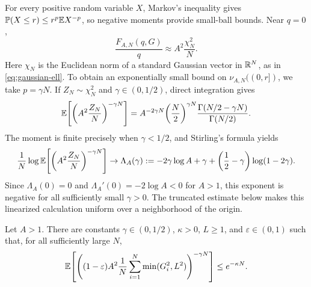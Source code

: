 \documentclass[11pt,reqno,a4paper]{article}
\newcommand{\Pp}{\P}
\newcommand{\Ee}{\E}
\begin{document}
\begin{remark}
\label{rem:gaussian-ell-negative-moments}
  For every positive random variable $X$, Markov's inequality gives
  $\Pp(X\leq r)\leq r^p\Ee X^{-p}$, so negative moments provide small-ball
  bounds. Near $q=0$,
  \begin{equation*}
    \frac{F_{A,N}(q,G)}{q}
    \approx
    A^2\frac{\chi_N^2}{N}.
  \end{equation*}
  Here $\chi_N$ is the Euclidean norm of a standard Gaussian vector in
  $\mathbb{R}^N$, as in \cref{eq:gaussian-ell}.
  To obtain an exponentially small bound on $\nu_{A,N}((0,r])$, we take
  $p=\gamma N$. If $Z_N\sim\chi_N^2$ and
  $\gamma\in(0,1/2)$, direct integration gives
  \begin{equation*}
    \Ee\left[
      \left(
        A^2\frac{Z_N}{N}
      \right)^{-\gamma N}
    \right]
    =
    A^{-2\gamma N}
    \left(\frac N2\right)^{\gamma N}
    \frac{\Gamma(N/2-\gamma N)}{\Gamma(N/2)}.
  \end{equation*}
  The moment is finite precisely when $\gamma<1/2$, and Stirling's formula
  yields
  \begin{equation*}
    \frac1N
    \log
    \Ee\left[
      \left(
        A^2\frac{Z_N}{N}
      \right)^{-\gamma N}
    \right]
    \to
    \Lambda_A(\gamma)
    :=
    -2\gamma\log A
    +
    \gamma
    +
    \left(\frac12-\gamma\right)\log(1-2\gamma).
  \end{equation*}
  Since $\Lambda_A(0)=0$ and
  $\Lambda_A'(0)=-2\log A<0$ for $A>1$, this exponent is negative for all
  sufficiently small $\gamma>0$. The truncated estimate below makes this
  linearized calculation uniform over a neighborhood of the origin.
\end{remark}

\begin{lemma}
\label{lem:gaussian-truncated-cramer}
  Let $A>1$. There are constants
  $\gamma\in(0,1/2)$, $\kappa>0$, $L\geq1$, and
  $\varepsilon\in(0,1)$ such that, for all sufficiently large $N$,
  \begin{equation}\label{eq:gaussian-truncated-cramer}
    \Ee\left[
      \left(
        (1-\varepsilon)A^2
        \frac1N\sum_{i=1}^N\min(G_i^2,L^2)
      \right)^{-\gamma N}
    \right]
    \leq
    e^{-\kappa N}.
  \end{equation}
\end{lemma}
\end{document}
